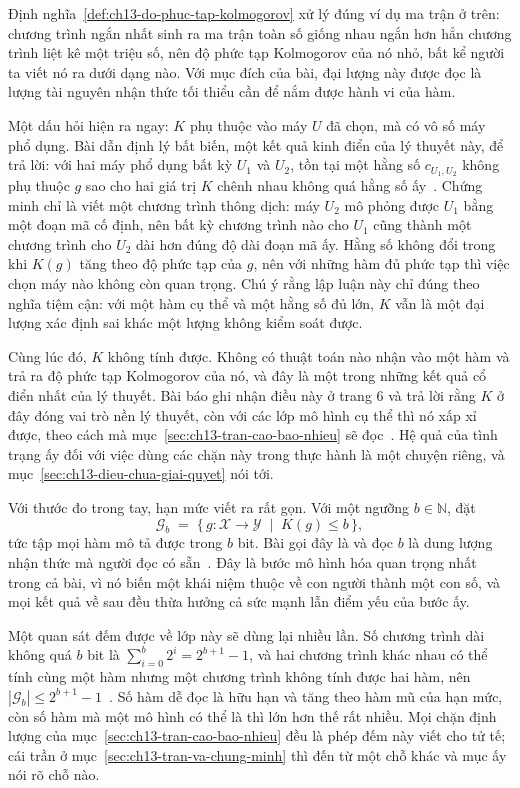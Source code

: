 Định nghĩa~\ref{def:ch13-do-phuc-tap-kolmogorov} xử lý đúng ví dụ ma trận ở
trên: chương trình
ngắn nhất sinh ra ma trận toàn số giống nhau ngắn hơn hẳn chương trình liệt kê
một triệu số, nên độ phức tạp Kolmogorov của nó nhỏ, bất kể người ta viết nó ra
dưới dạng nào. Với mục đích của bài, đại lượng này được đọc là lượng tài nguyên
nhận thức tối thiểu cần để nắm được hành vi của hàm.

Một dấu hỏi hiện ra ngay: $K$ phụ thuộc vào máy $U$ đã chọn, mà có vô số máy phổ
dụng. Bài dẫn định lý bất biến, một kết quả kinh điển của lý thuyết này, để trả
lời: với hai máy phổ dụng bất kỳ $U_1$ và $U_2$, tồn tại một hằng số
$c_{U_1,U_2}$ không phụ thuộc $g$ sao cho hai giá trị $K$ chênh nhau không quá
hằng số ấy~\autocite{p26limits}. Chứng minh chỉ là viết một chương trình thông
dịch: máy $U_2$ mô phỏng được $U_1$ bằng một đoạn mã cố định, nên bất kỳ chương
trình nào cho $U_1$ cũng thành một chương trình cho $U_2$ dài hơn đúng độ dài
đoạn mã ấy. Hằng số không đổi trong khi $K(g)$ tăng theo độ phức tạp của $g$,
nên với những hàm đủ phức tạp thì việc chọn máy nào không còn quan trọng. Chú ý
rằng lập luận này chỉ đúng theo nghĩa tiệm cận: với một hàm cụ thể và một hằng
số đủ lớn, $K$ vẫn là một đại lượng xác định sai khác một lượng không kiểm soát
được.

Cùng lúc đó, $K$ không tính được. Không có thuật toán nào nhận vào một hàm và
trả ra độ phức tạp Kolmogorov của nó, và đây là một trong những kết quả cổ điển
nhất của lý thuyết. Bài báo ghi nhận điều này ở trang 6 và trả lời rằng $K$ ở
đây đóng vai trò nền lý thuyết, còn với các lớp mô hình cụ thể thì nó xấp xỉ
được, theo cách mà mục~\ref{sec:ch13-tran-cao-bao-nhieu} sẽ
đọc~\autocite{p26limits}. Hệ quả của tình trạng ấy đối với việc dùng các chặn
này trong thực hành là một chuyện riêng, và
mục~\ref{sec:ch13-dieu-chua-giai-quyet} nói tới.

%
Với thước đo trong tay, hạn mức viết ra rất gọn. Với một ngưỡng
$b \in \mathbb{N}$, đặt
\[
  \mathcal{G}_b \;=\; \{\, g : \mathcal{X} \to \mathcal{Y} \;\mid\; K(g) \le b \,\},
\]
tức tập mọi hàm mô tả được trong $b$ bit. Bài gọi đây là  và đọc $b$ là dung lượng nhận thức mà người đọc có
sẵn~\autocite{p26limits}. Đây là bước mô hình hóa quan trọng nhất trong cả bài,
vì nó biến một khái niệm thuộc về con người thành một con số, và mọi kết quả về
sau đều thừa hưởng cả sức mạnh lẫn điểm yếu của bước ấy.

Một quan sát đếm được về lớp này sẽ dùng lại nhiều lần. Số chương trình dài
không quá $b$ bit là $\sum_{i=0}^{b} 2^i = 2^{b+1} - 1$, và hai chương trình khác
nhau có thể tính cùng một hàm nhưng một chương trình không tính được hai hàm,
nên $|\mathcal{G}_b| \le 2^{b+1} - 1$~\autocite{p26limits}. Số hàm dễ đọc là hữu
hạn và tăng theo hàm mũ của hạn mức, còn số hàm mà một mô hình có thể là thì lớn
hơn thế rất nhiều. Mọi chặn định lượng của
mục~\ref{sec:ch13-tran-cao-bao-nhieu} đều là phép đếm này viết cho tử tế; cái
trần ở mục~\ref{sec:ch13-tran-va-chung-minh} thì đến từ một chỗ khác và mục ấy
nói rõ chỗ nào.

